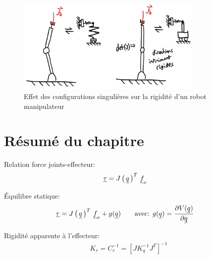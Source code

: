 \begin{figure}[htbp]
	\centering
	\includegraphics[width=0.80\textwidth]{fig/robotcompliance_singular.jpg}
	\caption{Effet des configurations singulières sur la rigidité d'un robot manipulateur}
	\label{fig:robotcompliance_singular}
\end{figure}

\newpage
\section{Résumé du chapitre}


Relation force joints-effecteur:
\begin{align}
	\underline{\tau} &= J\left( \, \underline{q} \, \right)^T \, \underline{f}_e
\end{align}

Équilibre statique:
\begin{align}
	\underline{\tau} &= J\left( \, \underline{q} \, \right)^T \, \underline{f}_e +  g( \underline{q} )
	\quad \quad \text{avec:  }
	g( \underline{q} ) =
	\frac{ \partial V(\underline{q} ) }{\partial \underline{q} }
\end{align}

Rigidité apparente à l'effecteur:
\begin{align}
	K_r = C_r^{-1} = \left[ J K_q^{-1} J^T \right]^{-1}
\end{align}

